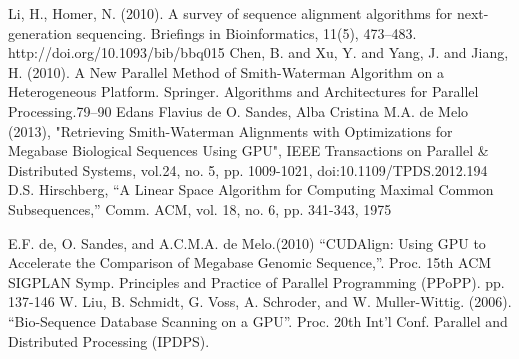 \documentclass[%
   10pt,              %
   ngerman,           %
   a4paper,           %
   DIV11,             %
]{scrartcl}%
\begin{document}
\begin{thebibliography}{widestlabel}
	Li, H., Homer, N. (2010). A survey of sequence alignment algorithms for next-generation sequencing. Briefings in Bioinformatics, 11(5), 473–483. http://doi.org/10.1093/bib/bbq015
		Chen, B. and Xu, Y. and Yang, J. and Jiang, H. (2010). A New Parallel Method of Smith-Waterman Algorithm on a Heterogeneous Platform. Springer. Algorithms and Architectures for Parallel Processing.79–90
	Edans Flavius de O. Sandes, Alba Cristina M.A. de Melo (2013), "Retrieving Smith-Waterman Alignments with Optimizations for Megabase Biological Sequences Using GPU", IEEE Transactions on Parallel \& Distributed Systems, vol.24, no. 5, pp. 1009-1021, doi:10.1109/TPDS.2012.194 
	D.S. Hirschberg, “A Linear Space Algorithm for Computing Maximal Common Subsequences,” Comm. ACM, vol. 18, no. 6, pp. 341-343, 1975
	
	E.F. de, O. Sandes, and A.C.M.A. de Melo.(2010) “CUDAlign: Using GPU to Accelerate the Comparison of Megabase Genomic Sequence,”.	Proc. 15th ACM SIGPLAN Symp. Principles and Practice
	of Parallel Programming (PPoPP). pp. 137-146
	W. Liu, B. Schmidt, G. Voss, A. Schroder, and W. Muller-Wittig. (2006). “Bio-Sequence Database Scanning on a GPU”.	Proc. 20th Int’l Conf. Parallel and Distributed Processing (IPDPS).
	\end{thebibliography}
\end{document}
